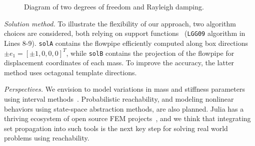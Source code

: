 \documentclass{juliacon}
\begin{document}
\vspace{-0.1cm}

\begin{figure}[htb]
	\centering
 \def\svgwidth{0.25\textwidth}
 
 \caption{Diagram of two degrees of freedom and Rayleigh damping.}
 \label{fig:diagram}
\end{figure}


\noindent \emph{Solution method.} To illustrate the flexibility of our approach, two algorithm choices are considered, both relying on support functions~\cite{LeGuernic2010250} (\texttt{LGG09} algorithm in Lines 8-9).
%
\texttt{solA} contains the flowpipe efficiently computed along box directions $\pm e_1 = [\pm 1, 0, 0, 0]^T$, while \texttt{solB} contains the projection of the flowpipe for displacement coordinates of each mass. To improve the accuracy, the latter method uses octagonal template directions.

\vspace{0.2cm}

\noindent \emph{Perspectives.} We envision to model variations in mass and stiffness parameters using interval methods~\cite{forets2021intervalmat, ferranti2021interval}.
%
Probabilistic reachability, and modeling nonlinear behaviors using state-space abstraction methods, are also planned.
%
Julia has a thriving ecosystem of open source FEM projects~\cite{Gridap,Ferrite,FinEtools}, and we think that integrating set propagation into such tools is the next key step for solving real world problems using reachability.


	
\end{document}
